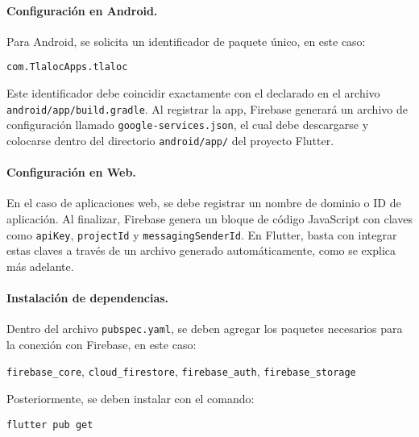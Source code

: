\paragraph{Configuración en Android.}  
Para Android, se solicita un identificador de paquete único, en este caso:

\begin{center}
  \texttt{com.TlalocApps.tlaloc}
\end{center}

Este identificador debe coincidir exactamente con el declarado en el archivo \texttt{android/app/build.gradle}. Al registrar la app, Firebase generará un archivo de configuración llamado \texttt{google-services.json}, el cual debe descargarse y colocarse dentro del directorio \texttt{android/app/} del proyecto Flutter.

\vspace{1em}

\paragraph{Configuración en Web.}  
En el caso de aplicaciones web, se debe registrar un nombre de dominio o ID de aplicación. Al finalizar, Firebase genera un bloque de código JavaScript con claves como \texttt{apiKey}, \texttt{projectId} y \texttt{messagingSenderId}. En Flutter, basta con integrar estas claves a través de un archivo generado automáticamente, como se explica más adelante.

\vspace{1em}

\paragraph{Instalación de dependencias.}  
Dentro del archivo \texttt{pubspec.yaml}, se deben agregar los paquetes necesarios para la conexión con Firebase, en este caso:

\begin{center}
  \texttt{firebase\_core}, \quad
  \texttt{cloud\_firestore}, \quad
  \texttt{firebase\_auth}, \quad
  \texttt{firebase\_storage}
\end{center}

Posteriormente, se deben instalar con el comando:

\begin{center}
  \texttt{flutter pub get}
\end{center}

\vspace{1em}

